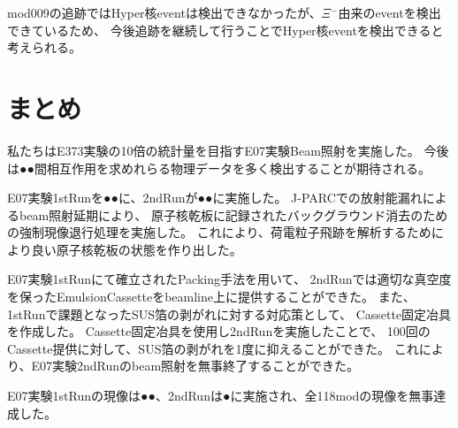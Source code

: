 \documentclass[12pt,a4paper]{jarticle}
\begin{document}
mod009の追跡ではHyper核eventは検出できなかったが、$\Xi$$^-$由来のeventを検出できているため、
今後追跡を継続して行うことでHyper核eventを検出できると考えられる。

\newpage
\section{まとめ}
私たちはE373実験の10倍の統計量を目指すE07実験Beam照射を実施した。
今後は●●間相互作用を求めれらる物理データを多く検出することが期待される。
\par
E07実験1stRunを●●に、2ndRunが●●に実施した。
J-PARCでの放射能漏れによるbeam照射延期により、
原子核乾板に記録されたバックグラウンド消去のための強制現像退行処理を実施した。
これにより、荷電粒子飛跡を解析するためにより良い原子核乾板の状態を作り出した。
\par
E07実験1stRunにて確立されたPacking手法を用いて、
2ndRunでは適切な真空度を保ったEmulsionCassetteをbeamline上に提供することができた。
また、1stRunで課題となったSUS箔の剥がれに対する対応策として、
Cassette固定冶具を作成した。
Cassette固定冶具を使用し2ndRunを実施したことで、
100回のCassette提供に対して、SUS箔の剥がれを1度に抑えることができた。
これにより、E07実験2ndRunのbeam照射を無事終了することができた。
\par
E07実験1stRunの現像は●●、2ndRunは●に実施され、全118modの現像を無事達成した。
\par
\end{document}
